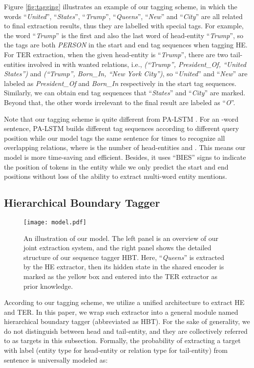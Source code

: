 \documentclass{ecai}
\begin{document}
Figure \ref{fig:tagging} illustrates an example of our tagging scheme, in which the words ``\emph{United}'', ``\emph{States}'', ``\emph{Trump}'', ``\emph{Queens}'', ``\emph{New}'' and  ``\emph{City}'' are all related to final extraction results, thus they are labelled with special tags. 
For example, the word ``\emph{Trump}'' is the first and also the last word of head-entity ``\emph{Trump}'', so the tags are both \emph{PERSON} in the start and end tag sequences when tagging HE. 
For TER extraction, when the given head-entity is ``\emph{Trump}'', there are two tail-entities involved in with wanted relations, i.e., \emph{(``Trump'', President\_Of, ``United States'')} and \emph{(``Trump'', Born\_In, ``New York City'')}, so ``\emph{United}'' and ``\emph{New}'' are labeled as \emph{President\_Of} and \emph{Born\_In} respectively in the start tag sequences. Similarly, we can obtain end tag sequences that ``\emph{States}'' and ``\emph{City}'' are marked. 
Beyond that, the other words irrelevant to the final result are labeled as ``\emph{O}''.


Note that our tagging scheme is quite different from PA-LSTM \cite{dai2019joint}. 
For an -word sentence, PA-LSTM builds  different tag sequences according to different query position while our model tags the same sentence for  times to recognize all overlapping relations, where  is the number of head-entities and . 
This means our model is more time-saving and efficient. 
Besides, it uses ``BIES''  signs to indicate the position of tokens in the entity while we only predict the start and end positions without loss of the ability to extract multi-word entity mentions.


\subsection{Hierarchical Boundary Tagger}

\begin{figure*}
  \centering
  \texttt{[image: model.pdf]}
    {\caption{An illustration of our model. The left panel is an overview of our joint extraction system, and the right panel shows the detailed structure of our sequence tagger HBT. Here, ``\textit{Queens}'' is extracted by the HE extractor, then its hidden state in the shared encoder is marked as the yellow box and entered into the TER  extractor as prior knowledge.
    }
    \label{fig:system}}
\end{figure*}

According to our tagging scheme, we utilize a unified architecture to extract HE and TER. 
In this paper, we wrap such extractor into a general module named hierarchical boundary tagger (abbreviated as HBT). 
For the sake of generality, we do not distinguish between head and tail-entity, and they are collectively referred to as targets in this subsection. 
Formally, the probability of extracting a target  with label  (entity type for head-entity or relation type for tail-entity) from sentence  is universally modeled as:
\end{document}

